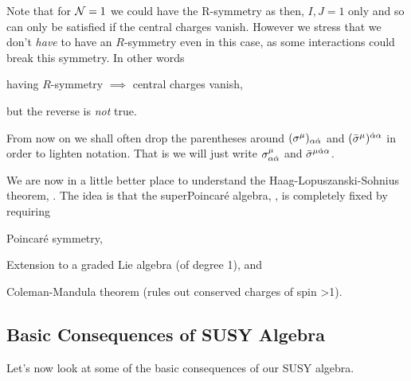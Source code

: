 \br 
    Note that for $\mathcal{N}=1$ we could have the R-symmetry as then, $I,J=1$ only and so  can only be satisfied if the central charges vanish. However we stress that we don't \textit{have} to have an $R$-symmetry even in this case, as some interactions could break this symmetry. In other words 
    \begin{center}
        having $R$-symmetry $\implies$ central charges vanish,
    \end{center}
    but the reverse is \textit{not} true. 
\er 

\bnn 
    From now on we shall often drop the parentheses around $(\sigma^{\mu})_{\alpha\dot{\alpha}}$ and $(\bar{\sigma}^{\mu})^{\dot{\alpha}\alpha}$ in order to lighten notation. That is we will just write $\sigma^{\mu}_{\alpha\dot{\alpha}}$ and $\bar{\sigma}^{\mu\dot{\alpha}\alpha}$.
\enn 

We are now in a little better place to understand the Haag-Lopuszanski-Sohnius theorem, . The idea is that the superPoincar\'{e} algebra, , is completely fixed by requiring
\ben[label=(\roman*)] 
    \item Poincar\'{e} symmetry,
    \item Extension to a graded Lie algebra (of degree 1), and 
    \item Coleman-Mandula theorem (rules out conserved charges of spin >1). 
\een

\subsection{Basic Consequences of SUSY Algebra}

Let's now look at some of the basic consequences of our SUSY algebra. 

